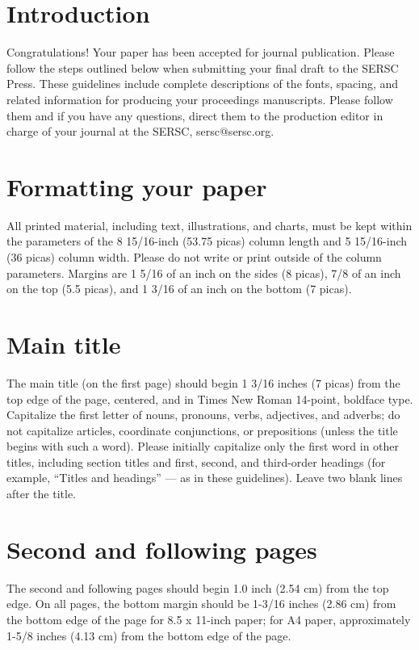 \documentclass[11pt]{scrartcl}
\begin{document}
	
\createSecTitle


\section{Introduction}
Congratulations! Your paper has been accepted for journal publication. Please follow the steps outlined below when submitting your final draft to the SERSC Press. These guidelines include complete descriptions of the fonts, spacing, and related information for producing your proceedings manuscripts. Please follow them and if you have any questions, direct them to the production editor in charge of your journal at the SERSC, sersc@sersc.org.

\section{Formatting your paper}
All printed material, including text, illustrations, and charts, must be kept within the parameters of the 8 15/16-inch (53.75 picas) column length and 5 15/16-inch (36 picas) column width. Please do not write or print outside of the column parameters. Margins are 1 5/16 of an inch on the sides (8 picas), 7/8 of an inch on the top (5.5 picas), and 1 3/16 of an inch on the bottom (7 picas).

\section{Main title}
The main title (on the first page) should begin 1 3/16 inches (7 picas) from the top edge of the page, centered, and in Times New Roman 14-point, boldface type. Capitalize the first letter of nouns, pronouns, verbs, adjectives, and adverbs; do not capitalize articles, coordinate conjunctions, or prepositions (unless the title begins with such a word). Please initially capitalize only the first word in other titles, including section titles and first, second, and third-order headings (for example, “Titles and headings” — as in these guidelines). Leave two blank lines after the title.

\section{Second and following pages}
The second and following pages should begin 1.0 inch (2.54 cm) from the top edge. On all pages, the bottom margin should be 1-3/16 inches (2.86 cm) from the bottom edge of the page for 8.5 x 11-inch paper; for A4 paper, approximately 1-5/8 inches (4.13 cm) from the bottom edge of the page.
\end{document}
